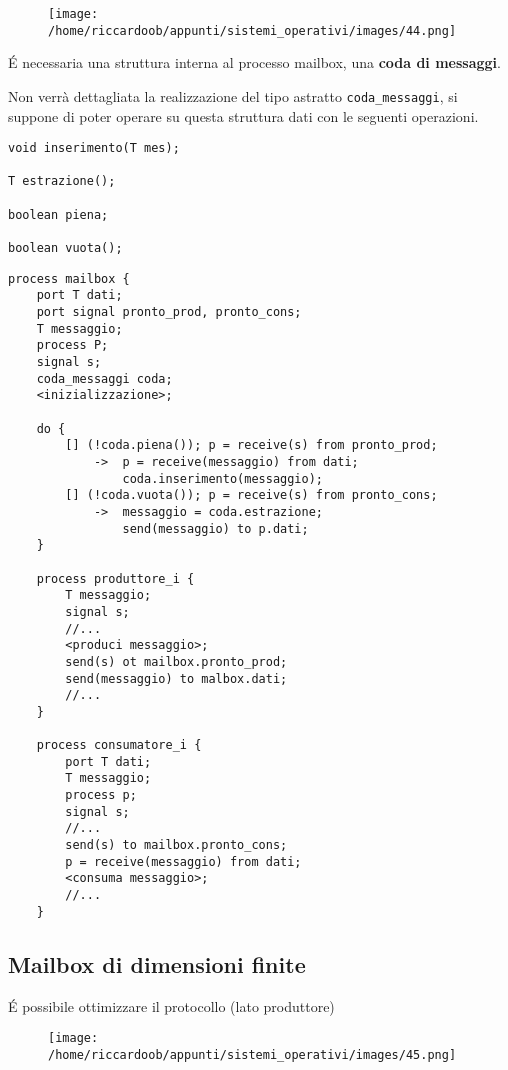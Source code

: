\begin{figure}[H]
    \centering
    \texttt{[image: /home/riccardoob/appunti/sistemi\_operativi/images/44.png]}
\end{figure}

É necessaria una struttura interna al processo mailbox, una \textbf{coda di messaggi}.

Non verrà dettagliata la realizzazione del tipo astratto \texttt{coda\_messaggi}, si suppone di poter operare su questa struttura dati con le seguenti operazioni.

\begin{verbatim}
void inserimento(T mes);

T estrazione();

boolean piena;

boolean vuota();
\end{verbatim}

\begin{verbatim}
process mailbox {
    port T dati;
    port signal pronto_prod, pronto_cons;
    T messaggio;
    process P;
    signal s;
    coda_messaggi coda;
    <inizializzazione>;

    do {
        [] (!coda.piena()); p = receive(s) from pronto_prod;
            ->  p = receive(messaggio) from dati;
                coda.inserimento(messaggio);
        [] (!coda.vuota()); p = receive(s) from pronto_cons;
            ->  messaggio = coda.estrazione;
                send(messaggio) to p.dati;
    }

    process produttore_i {
        T messaggio;
        signal s;
        //...
        <produci messaggio>;
        send(s) ot mailbox.pronto_prod;
        send(messaggio) to malbox.dati;
        //...
    }

    process consumatore_i {
        port T dati;
        T messaggio;
        process p;
        signal s;
        //...
        send(s) to mailbox.pronto_cons;
        p = receive(messaggio) from dati;
        <consuma messaggio>;
        //...
    }
\end{verbatim}

\subsection{Mailbox di dimensioni finite}
É possibile ottimizzare il protocollo (lato produttore)
\begin{figure}[H]
    \centering
    \texttt{[image: /home/riccardoob/appunti/sistemi\_operativi/images/45.png]}
\end{figure}

